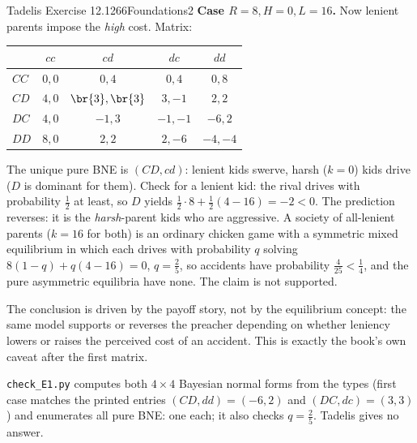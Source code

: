 \begin{exsol}{Tadelis Exercise 12.1}{266}{Foundations}{2}
\textbf{Case $R=8,H=0,L=16$.} Now lenient parents impose the \emph{high} cost. Matrix:
\begin{center}\small
\begin{tabular}{l|cccc}
 & $cc$ & $cd$ & $dc$ & $dd$\\\hline
$CC$ & $0,0$ & $0,4$ & $0,4$ & $0,8$\\
$CD$ & $4,0$ & $\br{3},\br{3}$ & $3,-1$ & $2,2$\\
$DC$ & $4,0$ & $-1,3$ & $-1,-1$ & $-6,2$\\
$DD$ & $8,0$ & $2,2$ & $2,-6$ & $-4,-4$
\end{tabular}
\end{center}
The unique pure BNE is $(CD,cd)$: lenient kids swerve, harsh ($k=0$) kids drive ($D$ is dominant
for them). Check for a lenient kid: the rival drives with probability $\tfrac12$ at least, so
$D$ yields $\tfrac12\cdot 8+\tfrac12(4-16)=-2<0$. The prediction reverses: it is the
\emph{harsh}-parent kids who are aggressive. A society of all-lenient parents ($k=16$ for both)
is an ordinary chicken game with a symmetric mixed equilibrium in which each drives with
probability $q$ solving $8(1-q)+q(4-16)=0$, $q=\tfrac25$, so accidents have probability
$\tfrac4{25}<\tfrac14$, and the pure asymmetric equilibria have none. The claim is not supported.

\interp The conclusion is driven by the payoff story, not by the equilibrium concept: the same
model supports or reverses the preacher depending on whether leniency lowers or raises the
perceived cost of an accident. This is exactly the book's own caveat after the first matrix.

\verify \texttt{check\_E1.py} computes both $4\times4$ Bayesian normal forms from the types
(first case matches the printed entries $(CD,dd)=(-6,2)$ and $(DC,dc)=(3,3)$) and enumerates
all pure BNE: one each; it also checks $q=\tfrac25$. Tadelis gives no answer.

\end{exsol}

